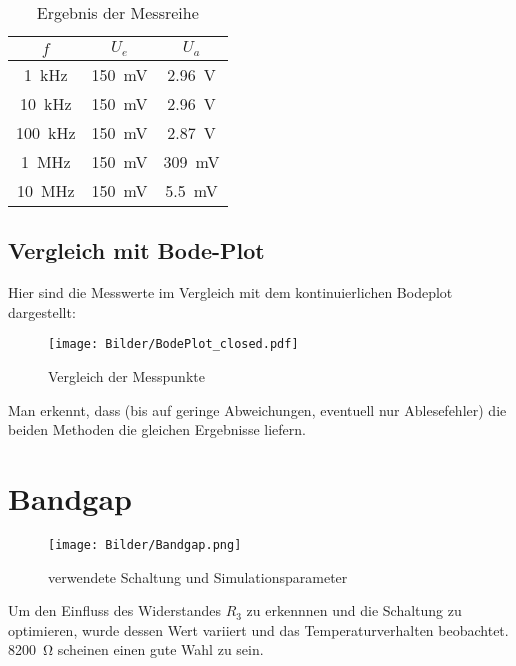 \begin{table}[H]
    \centering
    \begin{tabular}{|c||c|c|}
    \hline
         $f$ & $U_e$ & $U_a$  \\ \hline
         \SI{1}{\kilo \hertz} & \SI{150}{\milli \volt} & \SI{2.96}{\volt} \\ \hline
         \SI{10}{\kilo \hertz} & \SI{150}{\milli \volt} & \SI{2.96}{\volt} \\ \hline
         \SI{100}{\kilo \hertz} & \SI{150}{\milli \volt} & \SI{2.87}{\volt} \\ \hline
         \SI{1}{\mega \hertz} & \SI{150}{\milli \volt} & \SI{309}{\milli \volt}  \\ \hline
         \SI{10}{\mega \hertz} & \SI{150}{\milli \volt} & \SI{5.5}{\milli\volt}  \\ \hline
    \end{tabular}
    \caption{Ergebnis der Messreihe}
    \label{tab:my_label}
\end{table}

\subsection{Vergleich mit Bode-Plot}

Hier sind die Messwerte im Vergleich mit dem kontinuierlichen Bodeplot dargestellt:

\begin{figure}[H]
    \centering
    \texttt{[image: Bilder/BodePlot\_closed.pdf]}
    \caption{Vergleich der Messpunkte}
    \label{fig:my_label}
\end{figure}

Man erkennt, dass (bis auf geringe Abweichungen, eventuell nur Ablesefehler) die beiden Methoden die gleichen Ergebnisse liefern.

\section{Bandgap}

\begin{figure}[H]
    \centering
    \texttt{[image: Bilder/Bandgap.png]}
    \caption{verwendete Schaltung und Simulationsparameter}
\end{figure}

Um den Einfluss des Widerstandes $R_3$ zu erkennnen und die Schaltung zu optimieren, wurde dessen Wert variiert und das Temperaturverhalten beobachtet. \SI{8200}{\ohm} scheinen einen gute Wahl zu sein.



